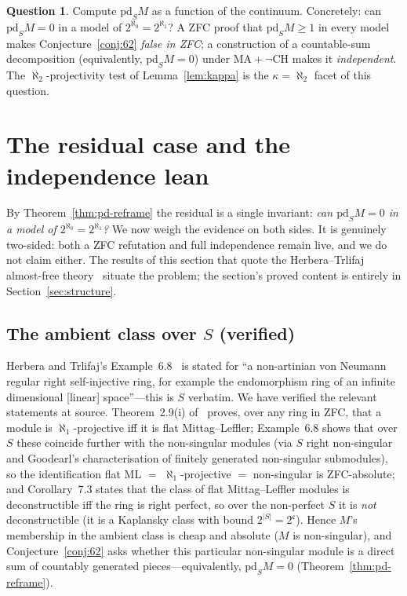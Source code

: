 \documentclass[11pt,reqno]{amsart}
\theoremstyle{plain}
\theoremstyle{definition}
\newtheorem{question}[theorem]{Question}
\theoremstyle{remark}
\newcommand{\pd}{\mathrm{pd}}
\begin{document}
\begin{question}\label{q:pd}
Compute $\pd_S M$ as a function of the continuum. Concretely: can $\pd_S M=0$ in a model of $2^{\aleph_0}=2^{\aleph_1}$? A ZFC proof that $\pd_S M\ge1$ in every model makes Conjecture~\ref{conj:62} \emph{false in \textup{ZFC}}; a construction of a countable-sum decomposition (equivalently, $\pd_S M=0$) under $\mathrm{MA}+\neg\mathrm{CH}$ makes it \emph{independent}. The $\aleph_2$-projectivity test of Lemma~\ref{lem:kappa} is the $\kappa=\aleph_2$ facet of this question.
\end{question}

\section{The residual case and the independence lean}\label{sec:residual}

By Theorem~\ref{thm:pd-reframe} the residual is a single invariant: \emph{can $\pd_S M=0$ in a model of $2^{\aleph_0}=2^{\aleph_1}$?} We now weigh the evidence on both sides. It is genuinely two-sided: both a ZFC refutation and full independence remain live, and we do not claim either. The results of this section that quote the Herbera--Trlifaj almost-free theory~\cite{herbera-trlifaj} situate the problem; the section's proved content is entirely in Section~\ref{sec:structure}.

\subsection*{The ambient class over $S$ (verified)}
Herbera and Trlifaj's Example~6.8~\cite{herbera-trlifaj} is stated for ``a non-artinian von Neumann regular right self-injective ring, for example the endomorphism ring of an infinite dimensional [linear] space''---this is $S$ verbatim. We have verified the relevant statements at source. Theorem~2.9(i) of~\cite{herbera-trlifaj} proves, over any ring in ZFC, that a module is $\aleph_1$-projective iff it is flat Mittag--Leffler; Example~6.8 shows that over $S$ these coincide further with the non-singular modules (via $S$ right non-singular and Goodearl's characterisation of finitely generated non-singular submodules), so the identification flat ML $=$ $\aleph_1$-projective $=$ non-singular is ZFC-absolute; and Corollary~7.3 states that the class of flat Mittag--Leffler modules is deconstructible iff the ring is right perfect, so over the non-perfect $S$ it is \emph{not} deconstructible (it is a Kaplansky class with bound $2^{|S|}=2^{\mathfrak c}$). Hence $M$'s membership in the ambient class is cheap and absolute ($M$ is non-singular), and Conjecture~\ref{conj:62} asks whether this particular non-singular module is a direct sum of countably generated pieces---equivalently, $\pd_S M=0$ (Theorem~\ref{thm:pd-reframe}).
\end{document}

